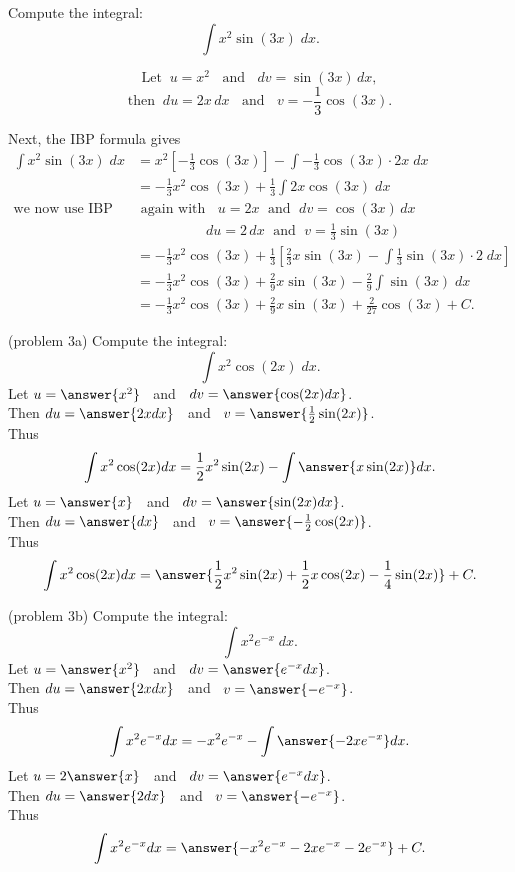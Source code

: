 \documentclass[handout]{ximera}
\begin{document}
\begin{example}
Compute the integral:
  \[
  \int x^2\sin(3x) \;dx.
  \]

\[
\text{Let} \;\; u = x^2 \;\; \text{   and   } \;\; dv = \sin(3x) \,dx,
\]
\[
\text{then} \;\; du = 2x \,dx \;\; \text{   and   } \;\; v = -\frac13 \cos(3x).
\]

Next, the IBP formula gives
\begin{align*}
\int x^2\sin(3x) \;dx &= x^2\left[-\frac13 \cos(3x)\right] - \int -\frac13 \cos(3x) \cdot 2x \; dx \\
                       &= -\frac13 x^2\cos(3x) + \frac13 \int 2x\cos(3x) \; dx\\                               
\text{we now use IBP} & \text{  again with  } \;\; u = 2x \;\text{  and  } \; dv = \cos(3x) \, dx\\
& \qquad \qquad \quad du = 2 \, dx \; \text{ and } \; v=\frac13 \sin(3x)\\
                       &= -\frac13 x^2\cos(3x) + \frac13\left[\frac23x\sin(3x) -  \int \frac13 \sin(3x)\cdot 2 \; dx\right]\\
                       &= -\frac13 x^2\cos(3x) + \frac29x\sin(3x) - \frac29 \int  \sin(3x) \; dx\\
                       &= -\frac13 x^2\cos(3x) + \frac29x\sin(3x) + \frac{2}{27} \cos(3x) + C.
\end{align*}

\end{example}


\begin{problem}(problem 3a)
Compute the integral:
  \[
  \int x^2\cos(2x) \;dx.
  \]
Let $u = \answer{x^2}\;\;$   and   $\;\;dv = \answer{\cos(2x) dx}$.\\
  Then $du = \answer{2x dx}\;\;$   and   $\;\;v = \answer{\frac12 \sin(2x)}$.\\
  Thus 
  \[
  \int x^2 \cos(2x) dx = \frac12 x^2 \sin(2x) -\int \answer{x \sin(2x)} dx.
  \]
Let $u = \answer{x}\;\;$   and   $\;\;dv = \answer{\sin(2x) dx}$.\\
  Then $du = \answer{dx}\;\;$   and   $\;\;v = \answer{-\frac12 \cos(2x)}$.\\ 
Thus 
  \[
  \int x^2 \cos(2x) dx = \answer{\frac12 x^2 \sin(2x) + \frac12 x \cos(2x) - \frac14 \sin(2x)} + C.
  \]  

\end{problem}

\begin{problem}(problem 3b)
Compute the integral:
  \[
  \int x^2e^{-x} \;dx.
  \]
Let $u = \answer{x^2}\;\;$   and   $\;\;dv = \answer{e^{-x} dx}$.\\
  Then $du = \answer{2x dx}\;\;$   and   $\;\;v = \answer{-e^{-x}}$.\\
  Thus 
  \[
  \int x^2 e^{-x} dx = -x^2 e^{-x} -\int \answer{-2xe^{-x}} dx.
  \]
Let $u = 2\answer{x}\;\;$   and   $\;\;dv = \answer{e^{-x} dx}$.\\
  Then $du = \answer{2 dx}\;\;$   and   $\;\;v = \answer{-e^{-x}}$.\\ 
Thus 
  \[
  \int x^2 e^{-x} dx = \answer{-x^2 e^{-x} - 2xe^{-x} - 2e^{-x}} + C.
  \]  
\end{problem}
\end{document}
